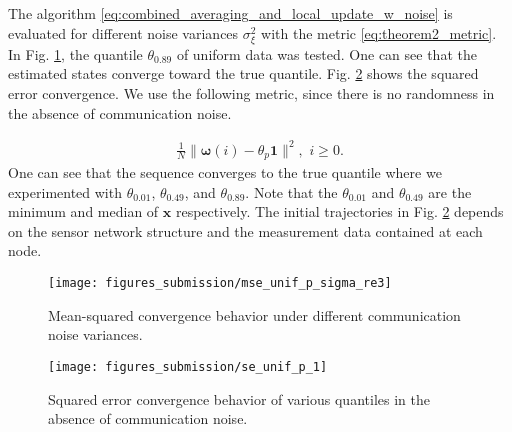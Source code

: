 \documentclass[journal]{IEEEtran}
\begin{document}
The algorithm \eqref{eq:combined_averaging_and_local_update_w_noise} is evaluated for different noise variances $\sigma_{\xi}^2$ with the metric \eqref{eq:theorem2_metric}. In Fig. \ref{fig:theorem1_n_2_result_unif_sigma}, the quantile $\theta_{0.89}$ of uniform data was tested. One can see that the estimated states converge toward the true quantile. Fig. \ref{fig:theorem1_n_2_result_unif_sigma_wo_noise} shows the squared error convergence. We use the following metric, since there is no randomness in the absence of communication noise.

\vspace{-4mm}
\small
\begin{align}
\frac{1}{N}\|\mathbf{\bm{\omega}}(i) - \theta_p\mathbf{1}\|^2, \,\,i \ge 0.
\end{align}
\normalsize
One can see that the sequence converges to the true quantile where we experimented with $\theta_{0.01}$, $\theta_{0.49}$, and $\theta_{0.89}$. Note that the $\theta_{0.01}$ and $\theta_{0.49}$ are the minimum and median of $\mathbf{x}$ respectively. The initial trajectories in Fig. \ref{fig:theorem1_n_2_result_unif_sigma_wo_noise} depends on the sensor network structure and the measurement data contained at each node. 

\begin{figure}
	\centering
	\texttt{[image: figures\_submission/mse\_unif\_p\_sigma\_re3]}
	\caption{Mean-squared convergence behavior under different communication noise variances.}
	\vspace{-4mm}
	\label{fig:theorem1_n_2_result_unif_sigma}
\end{figure}
\begin{figure}
	\centering
	\texttt{[image: figures\_submission/se\_unif\_p\_1]}
	\caption{Squared error convergence behavior of various quantiles in the absence of communication noise.}
	\vspace{-4mm}
	\label{fig:theorem1_n_2_result_unif_sigma_wo_noise}
\end{figure}

%
\end{document}
